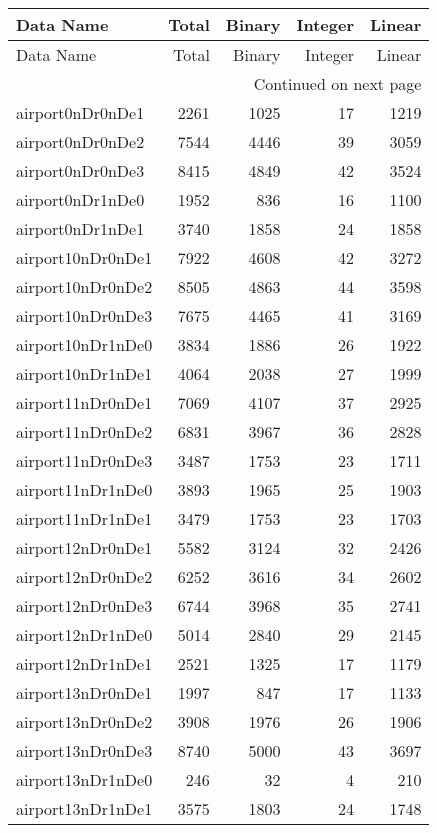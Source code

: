 
\begin{longtable}{lrrrr}
\toprule
Data Name & Total & Binary & Integer & Linear \\
\midrule
\endfirsthead
\toprule
Data Name & Total & Binary & Integer & Linear \\
\midrule
\endhead
\midrule
\multicolumn{5}{r}{Continued on next page} \\
\midrule
\endfoot
\bottomrule
\endlastfoot
airport0nDr0nDe1 & 2261 & 1025 & 17 & 1219 \\
airport0nDr0nDe2 & 7544 & 4446 & 39 & 3059 \\
airport0nDr0nDe3 & 8415 & 4849 & 42 & 3524 \\
airport0nDr1nDe0 & 1952 & 836 & 16 & 1100 \\
airport0nDr1nDe1 & 3740 & 1858 & 24 & 1858 \\
airport10nDr0nDe1 & 7922 & 4608 & 42 & 3272 \\
airport10nDr0nDe2 & 8505 & 4863 & 44 & 3598 \\
airport10nDr0nDe3 & 7675 & 4465 & 41 & 3169 \\
airport10nDr1nDe0 & 3834 & 1886 & 26 & 1922 \\
airport10nDr1nDe1 & 4064 & 2038 & 27 & 1999 \\
airport11nDr0nDe1 & 7069 & 4107 & 37 & 2925 \\
airport11nDr0nDe2 & 6831 & 3967 & 36 & 2828 \\
airport11nDr0nDe3 & 3487 & 1753 & 23 & 1711 \\
airport11nDr1nDe0 & 3893 & 1965 & 25 & 1903 \\
airport11nDr1nDe1 & 3479 & 1753 & 23 & 1703 \\
airport12nDr0nDe1 & 5582 & 3124 & 32 & 2426 \\
airport12nDr0nDe2 & 6252 & 3616 & 34 & 2602 \\
airport12nDr0nDe3 & 6744 & 3968 & 35 & 2741 \\
airport12nDr1nDe0 & 5014 & 2840 & 29 & 2145 \\
airport12nDr1nDe1 & 2521 & 1325 & 17 & 1179 \\
airport13nDr0nDe1 & 1997 & 847 & 17 & 1133 \\
airport13nDr0nDe2 & 3908 & 1976 & 26 & 1906 \\
airport13nDr0nDe3 & 8740 & 5000 & 43 & 3697 \\
airport13nDr1nDe0 & 246 & 32 & 4 & 210 \\
airport13nDr1nDe1 & 3575 & 1803 & 24 & 1748 \\

\end{longtable}
